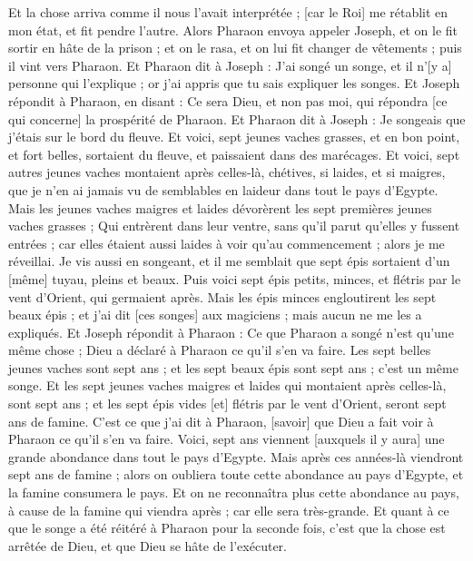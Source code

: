 \begin{multicols}{2}
Et la chose arriva comme il nous l'avait interprétée ; [car le Roi] me rétablit en mon état, et fit pendre l'autre.
Alors Pharaon envoya appeler Joseph, et on le fit sortir en hâte de la prison ; et on le rasa, et on lui fit changer de vêtements ; puis il vint vers Pharaon.
Et Pharaon dit à Joseph : J'ai songé un songe, et il n'[y a] personne qui l'explique ; or j'ai appris que tu sais expliquer les songes.
Et Joseph répondit à Pharaon, en disant : Ce sera Dieu, et non pas moi, qui répondra [ce qui concerne] la prospérité de Pharaon.
Et Pharaon dit à Joseph : Je songeais que j'étais sur le bord du fleuve.
Et voici, sept jeunes vaches grasses, et en bon point, et fort belles, sortaient du fleuve, et paissaient dans des marécages.
Et voici, sept autres jeunes vaches montaient après celles-là, chétives, si laides, et si maigres, que je n'en ai jamais vu de semblables en laideur dans tout le pays d'Egypte.
Mais les jeunes vaches maigres et laides dévorèrent les sept premières jeunes vaches grasses ;
Qui entrèrent dans leur ventre, sans qu'il parut qu'elles y fussent entrées ; car elles étaient aussi laides à voir qu'au commencement ; alors je me réveillai.
Je vis aussi en songeant, et il me semblait que sept épis sortaient d'un [même] tuyau, pleins et beaux.
Puis voici sept épis petits, minces, et flétris par le vent d'Orient, qui germaient après.
Mais les épis minces engloutirent les sept beaux épis ; et j'ai dit [ces songes] aux magiciens ; mais aucun ne me les a expliqués.
Et Joseph répondit à Pharaon : Ce que Pharaon a songé n'est qu'une même chose ; Dieu a déclaré à Pharaon ce qu'il s'en va faire.
Les sept belles jeunes vaches sont sept ans ; et les sept beaux épis sont sept ans ; c'est un même songe.
Et les sept jeunes vaches maigres et laides qui montaient après celles-là, sont sept ans ; et les sept épis vides [et] flétris par le vent d'Orient, seront sept ans de famine.
C'est ce que j'ai dit à Pharaon, [savoir] que Dieu a fait voir à Pharaon ce qu'il s'en va faire.
Voici, sept ans viennent [auxquels il y aura] une grande abondance dans tout le pays d'Egypte.
Mais après ces années-là viendront sept ans de famine ; alors on oubliera toute cette abondance au pays d'Egypte, et la famine consumera le pays.
Et on ne reconnaîtra plus cette abondance au pays, à cause de la famine qui viendra après ; car elle sera très-grande.
Et quant à ce que le songe a été réitéré à Pharaon pour la seconde fois, c'est que la chose est arrêtée de Dieu, et que Dieu se hâte de l'exécuter.

\end{multicols}
